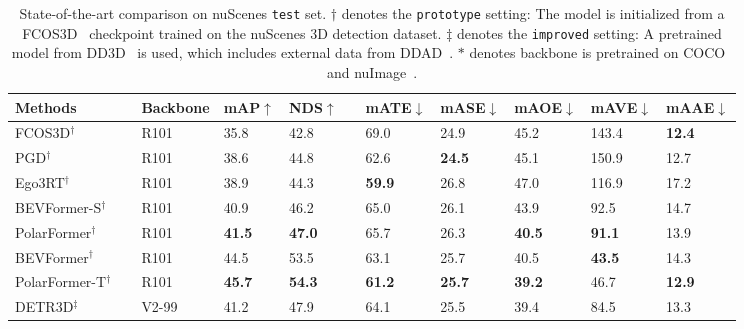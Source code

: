\documentclass[letterpaper]{article} \usepackage{aaai23}  \usepackage{times}  \usepackage{helvet}  \usepackage{courier}  \usepackage[hyphens]{url}  \usepackage{graphicx} \urlstyle{rm} \def\UrlFont{\rm}  \usepackage{natbib}  \usepackage{caption} \frenchspacing  \setlength{\pdfpagewidth}{8.5in} \setlength{\pdfpageheight}{11in} \usepackage{algorithm}
\begin{document}
\begin{table*}[!t]
\footnotesize
  \centering
\caption{
State-of-the-art comparison on nuScenes \texttt{test} set. 
$\dag$ denotes the \texttt{prototype} setting: The model is initialized from a FCOS3D~\cite{wang2021fcos3d} checkpoint trained on the nuScenes 3D detection dataset. 
$\ddag$ denotes the \texttt{improved} setting: A pretrained model from DD3D~\cite{park2021dd3d} is used, which includes external data from DDAD~\cite{packnet}. $*$ denotes backbone is pretrained on COCO~\cite{lin2014microsoft} and nuImage~\cite{nuscenes2019}. 
}
\label{table:state-of-the-art}
\renewcommand{\arraystretch}{1.0}
    \begin{tabular}{lC{0.0cm}C{1cm}C{1.2cm}C{0.5cm}C{0.15cm}C{0.75cm}C{0.75cm}C{0.75cm}C{0.75cm}C{0.75cm}}
    \hline

    \hline
    \textbf{Methods} &   & \textbf{Backbone} & \textbf{mAP}$\uparrow$  &\textbf{NDS}$\uparrow$  &   &\textbf{mATE}$\downarrow$   &\textbf{mASE}$\downarrow$   &\textbf{mAOE}$\downarrow$   &\textbf{mAVE}$\downarrow$   &\textbf{mAAE}$\downarrow$  \\
    \hline
    FCOS3D$^{\dag}$~\cite{wang2021fcos3d} & & R101 & 35.8 & 42.8 & & 69.0 & 24.9 & 45.2 & 143.4 & \textbf{12.4} \\
    PGD$^{\dag}$~\cite{wang2022probabilistic}& & R101 & 38.6 & 44.8 & & 62.6 & \textbf{24.5} & 45.1 & 150.9 & 12.7 \\
    Ego3RT$^{\dag}$~\cite{lu2022ego3rt} & & R101 & 38.9 & 44.3 & & \textbf{59.9} & 26.8 & 47.0 & 116.9 & 17.2 \\ 
    BEVFormer-S$^{\dag}$~\cite{li2022bevformer} & & R101 & 40.9 & 46.2 & & 65.0 & 26.1 & 43.9 & 92.5 & 14.7 \\
    PolarFormer$^{\dag}$ & & R101 & \textbf{41.5} & \textbf{47.0} & & 65.7 & 26.3 & \textbf{40.5} & \textbf{91.1} & 13.9 \\
    
    \cmidrule(lr){1-11}
    BEVFormer$^{\dag}$~\cite{li2022bevformer} & & R101 &  44.5 & 53.5 & & 63.1 & 25.7 & 40.5 & \textbf{43.5} & 14.3 \\
   
    PolarFormer-T$^{\dag}$ & & R101 &  \textbf{45.7} & \textbf{54.3} & & \textbf{61.2} & \textbf{25.7} & \textbf{39.2} & 46.7 & \textbf{12.9} \\
    \cmidrule(lr){1-11}
   
    DETR3D$^{\ddag}$~\cite{wang2022detr3d} & & V2-99 & 41.2  & 47.9 & & 64.1 & 25.5 & 39.4 & 84.5 & 13.3\\
    

\end{tabular}
\end{table*}
\end{document}
